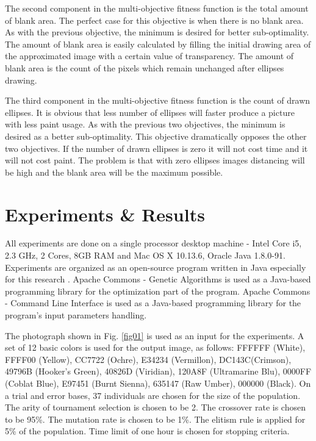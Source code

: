 \documentclass[conference]{IEEEtran}
\begin{document}
The second component in the multi-objective fitness function is the total amount of blank area. The perfect case for this objective is when there is no blank area. As with the previous objective, the minimum is desired for better sub-optimality. The amount of blank area is easily calculated by filling the initial drawing area of the approximated image with a certain value of transparency. The amount of blank area is the count of the pixels which remain unchanged after ellipses drawing. 

The third component in the multi-objective fitness function is the count of drawn ellipses. It is obvious that less number of ellipses will faster produce a picture with less paint usage. As with the previous two objectives, the minimum is desired as a better sub-optimality. This objective dramatically opposes the other two objectives. If the number of drawn ellipses is zero it will not cost time and it will not cost paint. The problem is that with zero ellipses images distancing will be high and the blank area will be the maximum possible. 

\section{Experiments \& Results}

All experiments are done on a single processor desktop machine - Intel Core i5, 2.3 GHz, 2 Cores, 8GB RAM and Mac OS X 10.13.6, Oracle Java 1.8.0-91. Experiments are organized as an open-source program written in Java especially for this research \cite{Balabanov-2020}. Apache Commons - Genetic Algorithms \cite{Apache-Commons-Genetic-Algorithms-2020} is used as a Java-based programming library for the optimization part of the program. Apache Commons - Command Line Interface \cite{Apache-Commons-Command-Line-Interface-2020} is used as a Java-based programming library for the program's input parameters handling.

The photograph shown in Fig. \ref{fig01} is used as an input for the experiments. A set of 12 basic colors is used for the output image, as follows:   FFFFFF (White), FFFF00 (Yellow), CC7722 (Ochre), E34234 (Vermillon), DC143C(Crimson), 49796B (Hooker's Green), 40826D (Viridian), 120A8F (Ultramarine Blu), 0000FF (Coblat Blue), E97451 (Burnt Sienna), 635147 (Raw Umber), 000000 (Black). On a trial and error bases, 37 individuals are chosen for the size of the population. The arity of tournament selection is chosen to be 2. The crossover rate is chosen to be 95\%. The mutation rate is chosen to be 1\%. The elitism rule is applied for 5\% of the population. Time limit of one hour is chosen for stopping criteria.
\end{document}
